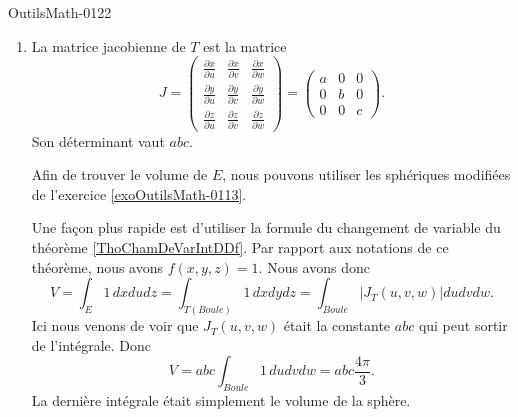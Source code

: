 \begin{corrige}{OutilsMath-0122}
\begin{enumerate}
        \item
            La matrice jacobienne de \( T\) est la matrice
            \begin{equation}
                J=\begin{pmatrix}
                    \frac{ \partial x }{ \partial u }    &   \frac{ \partial x }{ \partial v }    &   \frac{ \partial x }{ \partial w }    \\
                    \frac{ \partial y }{ \partial u }    &   \frac{ \partial y }{ \partial v }    &   \frac{ \partial y }{ \partial w }    \\
                    \frac{ \partial z }{ \partial u }    &   \frac{ \partial z }{ \partial v }    &   \frac{ \partial z }{ \partial w }    
                \end{pmatrix}=\begin{pmatrix}
                    a    &   0    &   0    \\
                    0    &   b    &   0    \\
                    0    &   0    &   c
                \end{pmatrix}.
            \end{equation}
            Son déterminant vaut \( abc\).

            Afin de trouver le volume de \( E\), nous pouvons utiliser les sphériques modifiées de l'exercice \ref{exoOutilsMath-0113}. 

            Une façon plus rapide est d'utiliser la formule du changement de variable du théorème \ref{ThoChamDeVarIntDDf}. Par rapport aux notations de ce théorème, nous avons \( f(x,y,z)=1\). Nous avons donc
            \begin{equation}
                V=\int_E1\,dxdudz=\int_{T(Boule)}1\,dxdydz=\int_{Boule}| J_T(u,v,w) |dudvdw.
            \end{equation}
            Ici nous venons de voir que \( J_T(u,v,w)\) était la constante \( abc\) qui peut sortir de l'intégrale. Donc
            \begin{equation}
                V=abc\int_{Boule}1\,dudvdw=abc\frac{ 4\pi }{ 3 }.
            \end{equation}
            La dernière intégrale était simplement le volume de la sphère.

    \end{enumerate}
    

\end{corrige}

